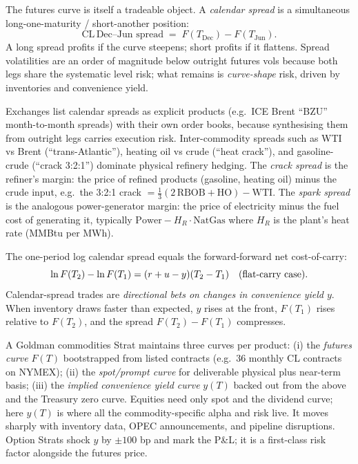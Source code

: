 The futures curve is itself a tradeable object.  A \emph{calendar
spread} is a simultaneous long-one-maturity / short-another
position:
\[
  \text{CL}\,\text{Dec}\text{--}\text{Jun spread}
    \;=\; F(T_{\text{Dec}}) - F(T_{\text{Jun}}).
\]
A long spread profits if the curve steepens; short profits if it
flattens.  Spread volatilities are an order of magnitude below
outright futures vols because both legs share the systematic level
risk; what remains is \emph{curve-shape} risk, driven by
inventories and convenience yield.

Exchanges list calendar spreads as explicit products (e.g.\ ICE
Brent ``BZU'' month-to-month spreads) with their own order books,
because synthesising them from outright legs carries execution risk.
Inter-commodity spreads such as WTI vs Brent (``trans-Atlantic''),
heating oil vs crude (``heat crack''), and gasoline-crude (``crack
3:2:1'') dominate physical refinery hedging.  The
\emph{crack spread} is the refiner's margin: the price of
refined products (gasoline, heating oil) minus the crude
input, e.g.\ the 3:2:1 crack $=\tfrac13(2\,\text{RBOB} +
\text{HO}) - \text{WTI}$.  The \emph{spark spread} is the
analogous power-generator margin: the price of electricity
minus the fuel cost of generating it, typically
$\text{Power} - H_R\cdot \text{NatGas}$ where $H_R$ is the
plant's heat rate (MMBtu per MWh).

\begin{keyfactbox}
The one-period log calendar spread equals the forward-forward net
cost-of-carry:
\[
  \ln F(T_2) - \ln F(T_1)
    = (r + u - y)(T_2 - T_1) \quad\text{(flat-carry case)}.
\]
Calendar-spread trades are \emph{directional bets on changes in
convenience yield $y$}.  When inventory draws faster than expected,
$y$ rises at the front, $F(T_1)$ rises relative to $F(T_2)$, and the
spread $F(T_2) - F(T_1)$ compresses.
\end{keyfactbox}

\begin{gsbox}[title={Curve construction on the commodities desk}]
A Goldman commodities Strat maintains three curves per product:
(i) the \emph{futures curve} $F(T)$ bootstrapped from listed
contracts (e.g.\ 36 monthly CL contracts on NYMEX); (ii) the
\emph{spot/prompt curve} for deliverable physical plus near-term
basis; (iii) the \emph{implied convenience yield curve} $y(T)$
backed out from the above and the Treasury zero curve.  Equities
need only spot and the dividend curve; here $y(T)$ is where all the
commodity-specific alpha and risk live.  It moves sharply with
inventory data, OPEC announcements, and pipeline disruptions.
Option Strats shock $y$ by $\pm 100$ bp and mark the P\&L; it is a
first-class risk factor alongside the futures price.
\end{gsbox}


